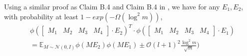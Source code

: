 \documentclass{article}
\newcommand{\cO}{\mathcal{O}}
\begin{document}
Using a similar proof as  Claim B.4 and Claim B.4 in \cite{rate}, we have for any $E_1, E_2$, with probability at least $1-exp(-\Omega(\log^2m))$,
\begin{equation}
\begin{aligned}
&\phi(
\begin{bmatrix}
M_1 &M_2 & M_3&M_4
\end{bmatrix}
\cdot
E_2)^T
\cdot\phi(
\begin{bmatrix}
M_1 &M_2 & M_3&M_4
\end{bmatrix}
\cdot
E_1)\\
&=\mathbb{E}_{M\sim \mathcal{N}(0, I)} \phi(ME_2)\phi(ME_1)\pm \cO({l+1})^2\frac{\log^2m}{\sqrt{m}})
\end{aligned}
\end{equation}

\end{document}
